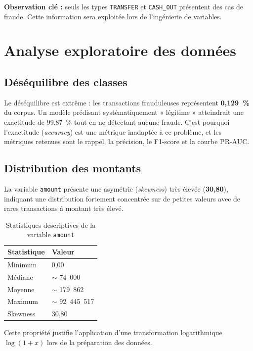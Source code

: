 \documentclass[12pt,a4paper,twoside]{report}
\begin{document}
\textbf{Observation clé :} seuls les types \texttt{TRANSFER} et \texttt{CASH\_OUT} présentent des cas de fraude. Cette information sera exploitée lors de l'ingénierie de variables.

\section{Analyse exploratoire des données}

\subsection{Déséquilibre des classes}

Le déséquilibre est extrême : les transactions frauduleuses représentent \textbf{0,129~\%} du corpus. Un modèle prédisant systématiquement « légitime » atteindrait une exactitude de 99,87~\% tout en ne détectant aucune fraude. C'est pourquoi l'exactitude (\textit{accuracy}) est une métrique inadaptée à ce problème, et les métriques retenues sont le rappel, la précision, le F1-score et la courbe PR-AUC.

\subsection{Distribution des montants}

La variable \texttt{amount} présente une asymétrie (\textit{skewness}) très élevée (\textbf{30,80}), indiquant une distribution fortement concentrée sur de petites valeurs avec de rares transactions à montant très élevé.

\begin{table}[H]
\centering
\caption{Statistiques descriptives de la variable \texttt{amount}}
\label{tab:amount_stats}
\begin{tabular}{ll}
\toprule
\textbf{Statistique} & \textbf{Valeur} \\
\midrule
Minimum   & 0,00 \\
Médiane   & $\sim$ 74~000 \\
Moyenne   & $\sim$ 179~862 \\
Maximum   & $\sim$ 92~445~517 \\
Skewness  & 30,80 \\
\bottomrule
\end{tabular}
\end{table}

Cette propriété justifie l'application d'une transformation logarithmique $\log(1+x)$ lors de la préparation des données.
\end{document}
